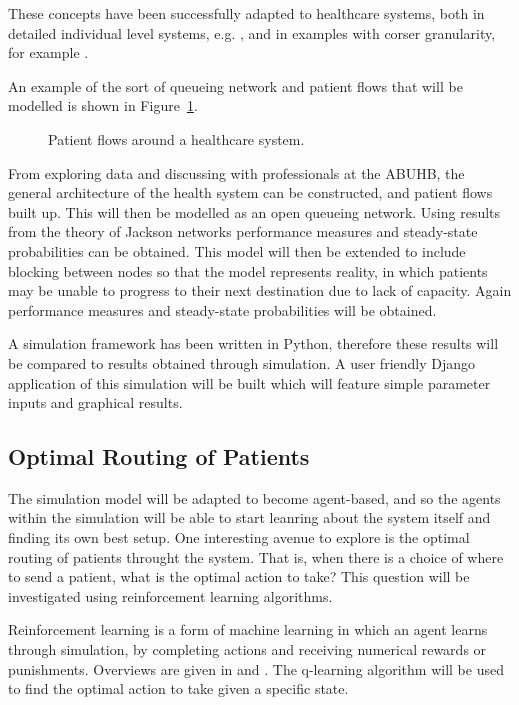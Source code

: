\documentclass{article}
\begin{document}
These concepts have been successfully adapted to healthcare systems, both in detailed individual level systems, e.g. \cite{albinetal90}, \cite{creemerslambrecht07} and in examples with corser granularity, for example \cite{koizumietal05}.

An example of the sort of queueing network and patient flows that will be modelled is shown in Figure~\ref{fig:healthsystem}.

\begin{figure}[H]
    
    \caption{Patient flows around a healthcare system.}
    \label{fig:healthsystem}
\end{figure}

From exploring data and discussing with professionals at the ABUHB, the general architecture of the health system can be constructed, and patient flows built up.
This will then be modelled as an open queueing network.
Using results from the theory of Jackson networks performance measures and steady-state probabilities can be obtained.
This model will then be extended to include blocking between nodes so that the model represents reality, in which patients may be unable to progress to their next destination due to lack of capacity.
Again performance measures and steady-state probabilities will be obtained.

A simulation framework has been written in Python, therefore these results will be compared to results obtained through simulation.
A user friendly Django application of this simulation will be built which will feature simple parameter inputs and graphical results.

\subsection{Optimal Routing of Patients}
The simulation model will be adapted to become agent-based, and so the agents within the simulation will be able to start leanring about the system itself and finding its own best setup.
One interesting avenue to explore is the optimal routing of patients throught the system.
That is, when there is a choice of where to send a patient, what is the optimal action to take?
This question will be investigated using reinforcement learning algorithms.

Reinforcement learning is a form of machine learning in which an agent learns through simulation, by completing actions and receiving numerical rewards or punishments.
Overviews are given in \cite{suttonbarto98} and \cite{szepesvari10}.
The q-learning algorithm will be used to find the optimal action to take given a specific state.
\end{document}
